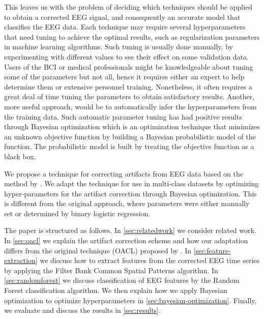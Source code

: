 This leaves us with the problem of deciding which techniques should be applied to obtain a corrected EEG signal, and consequently an accurate model that classifies the EEG data. Each technique may require several hyperparameters that need tuning to achieve the optimal results, such as regularization parameters in machine learning algorithms. Such tuning is usually done manually, by experimenting with different values to see their effect on some validation data. Users of the BCI or medical professionals might be knowledgeable about tuning some of the parameters but not all, hence it requires either an expert to help determine them or extensive personnel training. Nonetheless, it often requires a great deal of time tuning the parameters to obtain satisfactory results. Another, more useful approach, would be to automatically infer the hyperparameters from the training data. Such automatic parameter tuning has had positive results through Bayesian optimization \citep{brochu2010tutorial,snoek2012practical,shahriari2016taking} which is an optimization technique that minimizes an unknown objective function by building a Bayesian probabilistic model of the function. The probabilistic model is built by treating the objective function as a black box.

We propose a technique for correcting artifacts from EEG data based on the method by \citep{li2015ocular}. We adapt the technique for use in multi-class datasets by optimizing hyper-parameters for the artifact correction through Bayesian optimization. This is different from the original approach, where parameters were either manually set or determined by binary logistic regression.

The paper is structured as follows. In \cref{sec:relatedwork} we consider related work. In \cref{sec:oacl} we explain the artifact correction scheme and how our adaptation differs from the original technique (OACL) proposed by \citet{li2015ocular}. In \cref{sec:feature-extraction} we discuss how to extract features from the corrected EEG time series by applying the Filter Bank Common Spatial Patterns algorithm. In \cref{sec:randomforest} we discuss classification of EEG features by the Random Forest classification algorithm. We then explain how we apply Bayesian optimization to optimize hyperparameters in \cref{sec:bayesian-optimization}. Finally, we evaluate and discuss the results in \cref{sec:results}.

